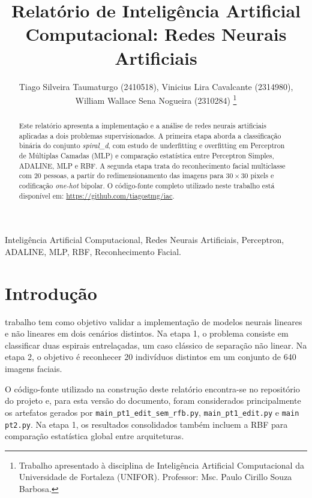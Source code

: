 \documentclass[journal,onecolumn]{IEEEtran}
\begin{document}
\title{Relatório de Inteligência Artificial Computacional: Redes Neurais Artificiais}

\author{Tiago Silveira Taumaturgo (2410518),
        Vinicius Lira Cavalcante (2314980), \\
        William Wallace Sena Nogueira (2310284)
\thanks{Trabalho apresentado à disciplina de Inteligência Artificial Computacional da Universidade de Fortaleza (UNIFOR). Professor: Msc. Paulo Cirillo Souza Barbosa.}}

\maketitle

\begin{abstract}
Este relatório apresenta a implementação e a análise de redes neurais artificiais aplicadas a dois problemas supervisionados. A primeira etapa aborda a classificação binária do conjunto \textit{spiral\_d}, com estudo de underfitting e overfitting em Perceptron de Múltiplas Camadas (MLP) e comparação estatística entre Perceptron Simples, ADALINE, MLP e RBF. A segunda etapa trata do reconhecimento facial multiclasse com 20 pessoas, a partir do redimensionamento das imagens para $30\times30$ pixels e codificação \textit{one-hot} bipolar. O código-fonte completo utilizado neste trabalho está disponível em: \href{https://github.com/tiagostmg/iac}{https://github.com/tiagostmg/iac}.
\end{abstract}

\begin{IEEEkeywords}
Inteligência Artificial Computacional, Redes Neurais Artificiais, Perceptron, ADALINE, MLP, RBF, Reconhecimento Facial.
\end{IEEEkeywords}

\section{Introdução}
 trabalho tem como objetivo validar a implementação de modelos neurais lineares e não lineares em dois cenários distintos. Na etapa 1, o problema consiste em classificar duas espirais entrelaçadas, um caso clássico de separação não linear. Na etapa 2, o objetivo é reconhecer 20 indivíduos distintos em um conjunto de 640 imagens faciais.

O código-fonte utilizado na construção deste relatório encontra-se no repositório do projeto e, para esta versão do documento, foram considerados principalmente os artefatos gerados por \texttt{main\_pt1\_edit\_sem\_rfb.py}, \texttt{main\_pt1\_edit.py} e \texttt{main pt2.py}. Na etapa 1, os resultados consolidados também incluem a RBF para comparação estatística global entre arquiteturas.
\end{document}
